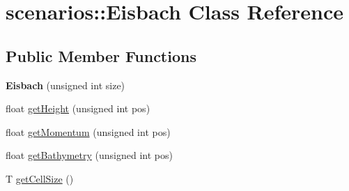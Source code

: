 \hypertarget{classscenarios_1_1Eisbach}{\section{scenarios\-:\-:Eisbach Class Reference}
\label{classscenarios_1_1Eisbach}
}
\subsection*{Public Member Functions}
\begin{DoxyCompactItemize}
\item 
\hypertarget{classscenarios_1_1Eisbach_a818284ea589bcf510501264ed0634551}{{\bfseries Eisbach} (unsigned int size)}\label{classscenarios_1_1Eisbach_a818284ea589bcf510501264ed0634551}

\item 
float \hyperlink{classscenarios_1_1Eisbach_a270f45c28660221993bc5d03e8584112}{get\-Height} (unsigned int pos)
\item 
float \hyperlink{classscenarios_1_1Eisbach_a46c324e8a3b802c128fc39b3af9b03b8}{get\-Momentum} (unsigned int pos)
\item 
float \hyperlink{classscenarios_1_1Eisbach_aa33d8066529ed79e5fe6c740c580fea1}{get\-Bathymetry} (unsigned int pos)
\item 
T \hyperlink{classscenarios_1_1Eisbach_a95f125cd53f44d333800052880d0f5d2}{get\-Cell\-Size} ()
\end{DoxyCompactItemize}



